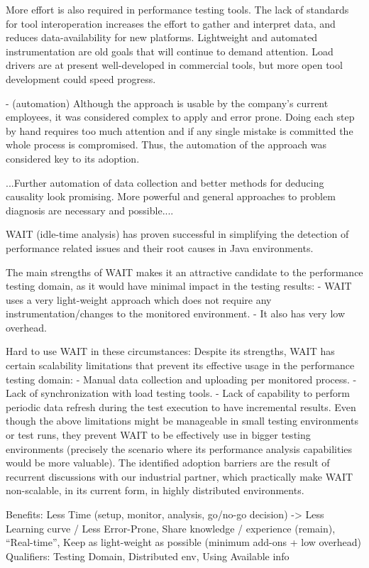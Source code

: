 \documentclass[runningheads,a4paper]{llncs}
\begin{document}
More effort is also required in performance testing tools. The lack of standards
for tool interoperation increases the effort to gather and interpret data, and
reduces data-availability for new platforms. Lightweight and automated
instrumentation are old goals that will continue to demand attention. Load
drivers are at present well-developed in commercial tools, but more open tool
development could speed progress.

- (automation) Although the approach is usable by the company’s current employees, it was
considered complex to apply and error prone. Doing each step by hand requires
too much attention and if any single mistake is committed the whole process is
compromised. Thus, the automation of the approach was considered key to its
adoption.

...Further automation of data collection and better methods for deducing
causality look promising. More powerful and general
approaches to problem diagnosis are necessary and
possible....





WAIT (idle-time analysis) has proven successful in simplifying the detection of performance related issues and their root causes in Java environments.

The main strengths of WAIT makes it an attractive candidate to the performance testing domain, as it would have minimal impact in the testing results:
- WAIT uses a very light-weight approach which does not require any instrumentation/changes to the monitored environment. 
- It also has very low overhead.

Hard to use WAIT in these circumstances: Despite its strengths, WAIT has certain
scalability limitations that prevent its effective usage in the performance testing domain:
- Manual data collection and uploading per monitored process.
- Lack of synchronization with load testing tools. 
- Lack of capability to perform periodic data refresh during the test execution to have incremental results.
Even though the above limitations might be manageable in small testing environments or test runs, they prevent WAIT to be effectively use in bigger testing environments (precisely the scenario where its performance analysis capabilities would be more valuable).
The identified adoption barriers are the result of recurrent discussions with our industrial partner, which practically make WAIT non-scalable, in its current form, in highly distributed environments.

Benefits: Less Time (setup, monitor, analysis, go/no-go decision) -> Less
Learning curve / Less Error-Prone, Share knowledge / experience (remain), “Real-time”, Keep as light-weight as possible (minimum add-ons + low overhead)
Qualifiers: Testing Domain, Distributed env, Using Available info
\end{document}
